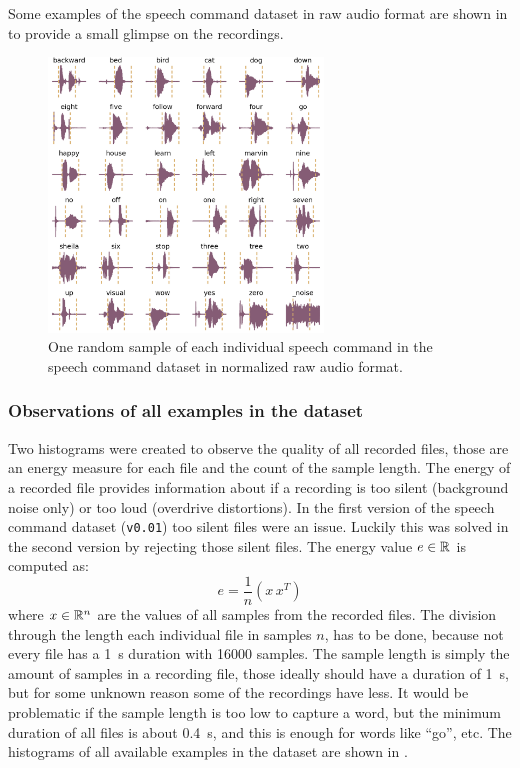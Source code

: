 Some examples of the speech command dataset in raw audio format are shown in  to provide a small glimpse on the recordings.
\begin{figure}[!ht]
  \centering
    \includegraphics[width=0.65\textwidth]{./5_exp/figs/exp_dataset_wav_grid_speech_commands_v2}
  \caption{One random sample of each individual speech command in the speech command dataset in normalized raw audio format.}
  \label{fig:exp_dataset_wav_grid_speech_commands_v2}
\end{figure}
\FloatBarrier
\noindent



\subsubsection{Observations of all examples in the dataset}
Two histograms were created to observe the quality of all recorded files, those are an energy measure for each file and the count of the sample length.
The energy of a recorded file provides information about if a recording is too silent (background noise only) or too loud (overdrive distortions). In the first version of the speech command dataset (\texttt{v0.01}) too silent files were an issue.
Luckily this was solved in the second version by rejecting those silent files.
The energy value $e \in \mathbb{R}$ is computed as:
\begin{equation}\label{eq:exp_dataset_energy}
  e = \frac{1}{n} \left( x\, x^T \right)
\end{equation}
where $x \in \mathbb{R}^n$ are the values of all samples from the recorded files.
The division through the length each individual file in samples $n$, has to be done, because not every file has a \SI{1}{\second} duration with 16000 samples.
The sample length is simply the amount of samples in a recording file, those ideally should have a duration of \SI{1}{\second}, but for some unknown reason some of the recordings have less.
It would be problematic if the sample length is too low to capture a word, but the minimum duration of all files is about \SI{0.4}{\second}, and this is enough for words like \enquote{go}, etc.
The histograms of all available examples in the dataset are shown in .

